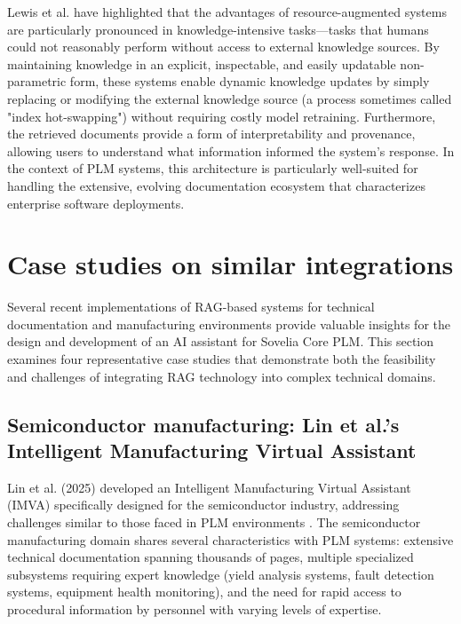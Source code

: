 Lewis et al. \parencite{lewis_retrieval-augmented_2021} have highlighted that the advantages of resource-augmented systems are particularly pronounced in knowledge-intensive tasks—tasks that humans could not reasonably perform without access to external knowledge sources. By maintaining knowledge in an explicit, inspectable, and easily updatable non-parametric form, these systems enable dynamic knowledge updates by simply replacing or modifying the external knowledge source (a process sometimes called "index hot-swapping") without requiring costly model retraining. Furthermore, the retrieved documents provide a form of interpretability and provenance, allowing users to understand what information informed the system's response. In the context of PLM systems, this architecture is particularly well-suited for handling the extensive, evolving documentation ecosystem that characterizes enterprise software deployments.

\section{Case studies on similar integrations}
\label{sec:case-studies-on-similar-integrations}

Several recent implementations of RAG-based systems for technical documentation and manufacturing environments provide valuable insights for the design and development of an AI assistant for Sovelia Core PLM. This section examines four representative case studies that demonstrate both the feasibility and challenges of integrating RAG technology into complex technical domains.

\subsection{Semiconductor manufacturing: Lin et al.'s Intelligent Manufacturing Virtual Assistant}

Lin et al. (2025) developed an Intelligent Manufacturing Virtual Assistant (IMVA) specifically designed for the semiconductor industry, addressing challenges similar to those faced in PLM environments \parencite{lin_generative_2025}. The semiconductor manufacturing domain shares several characteristics with PLM systems: extensive technical documentation spanning thousands of pages, multiple specialized subsystems requiring expert knowledge (yield analysis systems, fault detection systems, equipment health monitoring), and the need for rapid access to procedural information by personnel with varying levels of expertise.

